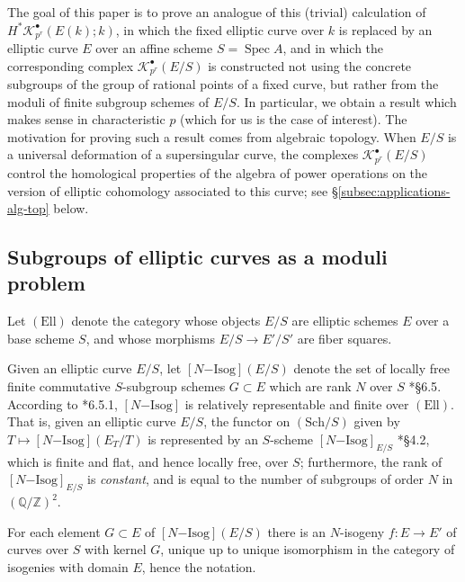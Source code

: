 \documentclass[11pt]{amsart}
\numberwithin{equation}{section}
\theoremstyle{plain}
\theoremstyle{remark}
\theoremstyle{plain}
\begin{document}
The goal of this paper is to prove an analogue of this (trivial)
calculation of $H^*{\mathscr{K}}_{p^r}^\bullet(E(k);k)$, in which the fixed elliptic
curve over $k$ is replaced by an elliptic curve $E$ over an affine scheme
$S={\operatorname{Spec}} A$, and in which the corresponding complex
${\mathscr{K}}^\bullet_{p^r}(E/S)$ is constructed not using the concrete
subgroups of the group of rational points of a fixed curve, but rather from the
moduli of finite subgroup schemes of $E/S$.  In particular, we obtain
a result which makes sense in characteristic $p$ (which for us is the
case of interest).  The motivation for proving such a result comes
from algebraic topology. When $E/S$ is a universal deformation of a
supersingular curve,   the complexes ${\mathscr{K}}^\bullet_{p^r}(E/S)$ control
the homological properties of the algebra of power operations on the
version of elliptic cohomology associated to this curve; see
\S\ref{subsec:applications-alg-top} below.

\subsection{Subgroups of elliptic curves as a moduli problem}

Let ${(\mathrm{Ell})}$ denote the category whose objects $E/S$ are elliptic schemes
$E$ over a base scheme $S$, and whose morphisms $E/S{\rightarrow} E'/S'$ are
fiber squares.

Given an elliptic curve $E/S$, let ${[{{N}}\mathrm{-Isog}]}(E/S)$ denote the set of
locally free finite commutative $S$-subgroup schemes $G\subset E$ which
are rank $N$ over $S$ \cite{katz-mazur}*{\S6.5}.  According to
\cite{katz-mazur}*{6.5.1}, ${[{{N}}\mathrm{-Isog}]}$ is relatively representable and
finite over ${(\mathrm{Ell})}$.  That is, given an elliptic curve $E/S$, the
functor on ${(\mathrm{Sch}/{S})}$ given by $T\mapsto {[{{N}}\mathrm{-Isog}]}(E_T/T)$ is
represented by an $S$-scheme ${[{{N}}\mathrm{-Isog}]}_{E/S}$
\cite{katz-mazur}*{\S4.2}, which is finite and flat, and hence locally
free, over $S$; 
furthermore, the rank of ${[{{N}}\mathrm{-Isog}]}_{E/S}$ is \emph{constant}, and is
equal to the number of subgroups of order $N$ in $({\mathbb{Q}}/{\mathbb{Z}})^2$.

For each element $G\subset E$ of ${[{{N}}\mathrm{-Isog}]}(E/S)$ there
is an  $N$-isogeny $f\colon E{\rightarrow} E'$ of curves over $S$ with kernel
$G$, unique up to unique isomorphism in the category of isogenies with
domain $E$, hence the notation.
\end{document}
